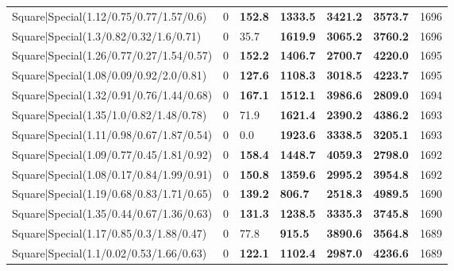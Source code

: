 \begin{tabular}{lrllllr}
 Square|Special(1.12/0.75/0.77/1.57/0.6)                       &             0   & \textbf{152.8} & \textbf{1333.5} & \textbf{3421.2} & \textbf{3573.7} &         1696 \\
 Square|Special(1.3/0.82/0.32/1.6/0.71)                        &             0   & 35.7           & \textbf{1619.9} & \textbf{3065.2} & \textbf{3760.2} &         1696 \\
 Square|Special(1.26/0.77/0.27/1.54/0.57)                      &             0   & \textbf{152.2} & \textbf{1406.7} & \textbf{2700.7} & \textbf{4220.0} &         1695 \\
 Square|Special(1.08/0.09/0.92/2.0/0.81)                       &             0   & \textbf{127.6} & \textbf{1108.3} & \textbf{3018.5} & \textbf{4223.7} &         1695 \\
 Square|Special(1.32/0.91/0.76/1.44/0.68)                      &             0   & \textbf{167.1} & \textbf{1512.1} & \textbf{3986.6} & \textbf{2809.0} &         1694 \\
 Square|Special(1.35/1.0/0.82/1.48/0.78)                       &             0   & 71.9           & \textbf{1621.4} & \textbf{2390.2} & \textbf{4386.2} &         1693 \\
 Square|Special(1.11/0.98/0.67/1.87/0.54)                      &             0   & 0.0            & \textbf{1923.6} & \textbf{3338.5} & \textbf{3205.1} &         1693 \\
 Square|Special(1.09/0.77/0.45/1.81/0.92)                      &             0   & \textbf{158.4} & \textbf{1448.7} & \textbf{4059.3} & \textbf{2798.0} &         1692 \\
 Square|Special(1.08/0.17/0.84/1.99/0.91)                      &             0   & \textbf{150.8} & \textbf{1359.6} & \textbf{2995.2} & \textbf{3954.8} &         1692 \\
 Square|Special(1.19/0.68/0.83/1.71/0.65)                      &             0   & \textbf{139.2} & \textbf{806.7}  & \textbf{2518.3} & \textbf{4989.5} &         1690 \\
 Square|Special(1.35/0.44/0.67/1.36/0.63)                      &             0   & \textbf{131.3} & \textbf{1238.5} & \textbf{3335.3} & \textbf{3745.8} &         1690 \\
 Square|Special(1.17/0.85/0.3/1.88/0.47)                       &             0   & 77.8           & \textbf{915.5}  & \textbf{3890.6} & \textbf{3564.8} &         1689 \\
 Square|Special(1.1/0.02/0.53/1.66/0.63)                       &             0   & \textbf{122.1} & \textbf{1102.4} & \textbf{2987.0} & \textbf{4236.6} &         1689 \\

\end{tabular}
